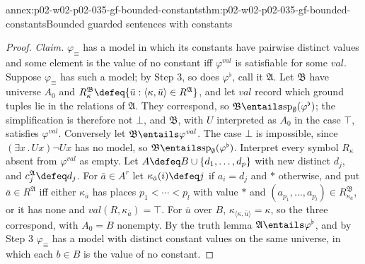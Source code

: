 \begin{annexitem}{annex:p02-w02-p02-035-gf-bounded-constants}{thm:p02-w02-p02-035-gf-bounded-constants}{Bounded guarded sentences with constants}
\begin{proof}
\emph{Claim.}  \(\varphi_\equiv\) has a model in which its constants have
pairwise distinct values and some element is the value of no constant iff
\(\varphi^{\mathit{val}}\) is satisfiable for some \(\mathit{val}\).  Suppose
\(\varphi_\equiv\) has such a model; by Step 3, so does \(\varphi^{\flat}\),
call it \(\mathfrak A\).  Let \(\mathfrak B\) have universe \(A_0\) and
\(R_\kappa^{\mathfrak B}\defeq\{\bar u:\langle\kappa,\bar u\rangle\in R^{\mathfrak A}\}\),
and let \(\mathit{val}\) record which ground tuples lie in the relations of
\(\mathfrak A\).  They correspond, so
\(\mathfrak B\entails\mathrm{sp}_\emptyset(\varphi^{\flat})\); the
simplification is therefore not \(\bot\), and \(\mathfrak B\), with \(U\)
interpreted as \(A_0\) in the case \(\top\), satisfies
\(\varphi^{\mathit{val}}\).  Conversely let
\(\mathfrak B\entails\varphi^{\mathit{val}}\).  The case \(\bot\) is
impossible, since \((\exists x\,.\,Ux)\neg Ux\) has no model, so
\(\mathfrak B\entails\mathrm{sp}_\emptyset(\varphi^{\flat})\).  Interpret
every symbol \(R_\kappa\) absent from \(\varphi^{\mathit{val}}\) as empty.  Let
\(A\defeq B\cup\{d_1,\ldots,d_p\}\) with new distinct \(d_j\), and
\(c_j^{\mathfrak A}\defeq d_j\).  For \(\bar a\in A^{r}\) let
\(\kappa_{\bar a}(i)\defeq j\) if \(a_i=d_j\) and \(\ast\) otherwise, and put
\(\bar a\in R^{\mathfrak A}\) iff either \(\kappa_{\bar a}\) has places
\(p_1<\cdots<p_l\) with value \(\ast\) and
\((a_{p_1},\ldots,a_{p_l})\in R_{\kappa_{\bar a}}^{\mathfrak B}\), or it has none
and \(\mathit{val}(R,\kappa_{\bar a})=\top\).  For \(\bar u\) over \(B\),
\(\kappa_{\langle\kappa,\bar u\rangle}=\kappa\), so the three correspond, with
\(A_0=B\) nonempty.  By the truth lemma \(\mathfrak A\entails\varphi^{\flat}\),
and by Step 3 \(\varphi_\equiv\) has a model with distinct constant values on
the same universe, in which each \(b\in B\) is the value of no constant.


\end{proof}
\end{annexitem}

